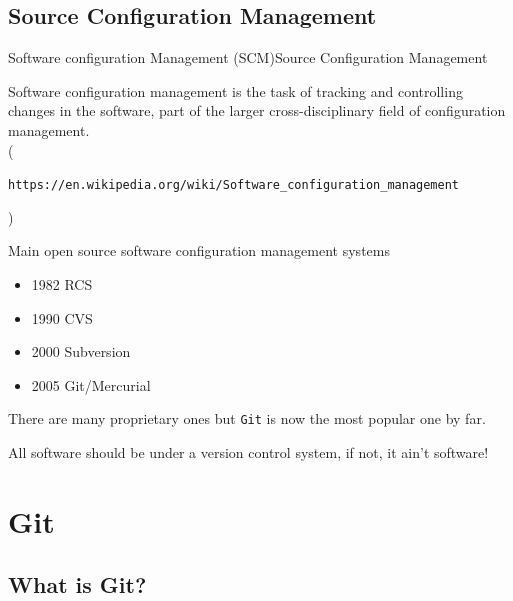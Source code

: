 \documentclass[10pt,compress]{beamer} %
\begin{document}

\subsection{Source Configuration Management}


\begin{frame}[plain]{Software configuration Management (SCM)}{Source Configuration Management}


Software configuration management is the task of tracking and controlling changes in the software, part of the larger cross-disciplinary field of configuration management.\\
(\begin{scriptsize}\texttt{https://en.wikipedia.org/wiki/Software\_configuration\_management}                                                                                         \end{scriptsize})

Main open source software configuration management systems
\begin{itemize}
 \item 1982 RCS
 \item 1990 CVS
 \item 2000 Subversion
 \item 2005 Git/Mercurial
\end{itemize}

There are many proprietary ones but \texttt{Git} is now the most popular one by far.

All software should be under a version control system, if not, it ain't software!

\end{frame}


\section{Git}

\subsection{What is Git?}
\end{document}
